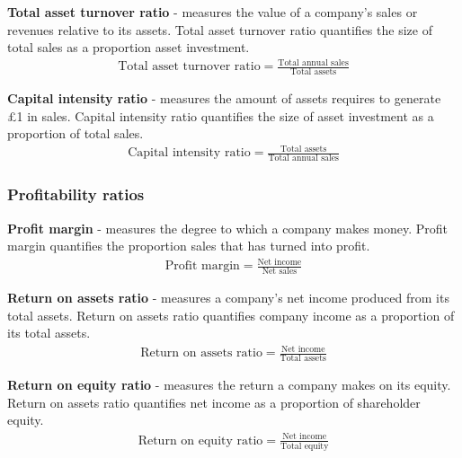 \textbf{Total asset turnover ratio} - measures the value of a company's sales or revenues relative to its assets. Total asset turnover ratio quantifies the size of total sales as a proportion asset investment.
\begin{gather}
    \textrm{Total asset turnover ratio} = \frac{\textrm{Total annual sales}}{\textrm{Total assets}}
\end{gather}

\textbf{Capital intensity ratio} - measures the amount of assets requires to generate \pounds 1 in sales. Capital intensity ratio quantifies the size of asset investment as a proportion of total sales.
\begin{gather}
    \textrm{Capital intensity ratio} = \frac{\textrm{Total assets}}{\textrm{Total annual sales}}
\end{gather}
\subsubsection{Profitability ratios}
\textbf{Profit margin} - measures the degree to which a company makes money. Profit margin quantifies the proportion sales that has turned into profit.
\begin{gather}
    \textrm{Profit margin} = \frac{\textrm{Net income}}{\textrm{Net sales}}
\end{gather}

\textbf{Return on assets ratio} - measures a company's net income produced from its total assets. Return on assets ratio quantifies company income as a proportion of its total assets.
\begin{gather}
    \textrm{Return on assets ratio} = \frac{\textrm{Net income}}{\textrm{Total assets}}
\end{gather}

\textbf{Return on equity ratio} - measures the return a company makes on its equity. Return on assets ratio quantifies net income as a proportion of shareholder equity.
\begin{gather}
    \textrm{Return on equity ratio} = \frac{\textrm{Net income}}{\textrm{Total equity}}
\end{gather}
